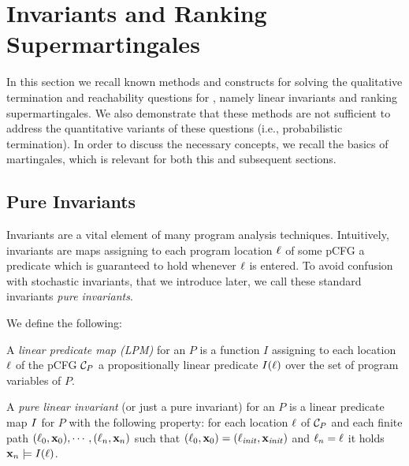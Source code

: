 \section{Invariants and Ranking Supermartingales}\label{sec:invm}

In this section we recall known methods and constructs for solving the 
qualitative termination and reachability questions for , namely  
linear invariants and ranking supermartingales. 
We also demonstrate that these methods are not sufficient to address the 
quantitative variants of these questions (i.e., probabilistic termination).
In order to discuss the necessary concepts, we recall the basics of 
martingales, which is relevant for both this and subsequent sections. 


\subsection{Pure Invariants}

Invariants are a vital element of many program analysis techniques. 
Intuitively, invariants are maps assigning to each 
program location $\ell$ of some pCFG a predicate which is guaranteed to hold 
whenever $\ell$ is 
entered. To avoid confusion with stochastic invariants, 
that we introduce later, we call these standard invariants \emph{pure invariants}.

\smallskip
\begin{definition} We define the 
following:
\begin{compactenum}
\item
A \emph{linear predicate map (LPM)} for an \APP{} $P$ is a function $I$ 
assigning to each location $\ell$ of the pCFG $\mathcal{C}_P$ a propositionally 
linear predicate $I(\ell)$ over the set of program variables of $P$.
\item
A \emph{pure linear invariant} (or just a pure invariant) for an \APP{} $P$ is 
a linear predicate map $I$ for $P$ with
the following property: for each location $\ell$ of $\mathcal{C}_P$ and each finite 
path $(\ell_0,\mathbf{x}_0),\cdots,(\ell_n,\mathbf{x}_n)$ such that 
$(\ell_0,\mathbf{x}_0)=(\ell_{\mathit{init}},\mathbf{x}_{\mathit{init}})$ and $\ell_n = \ell$ it holds
$\mathbf{x}_n\models I(\ell)$.
\end{compactenum}
\end{definition}



